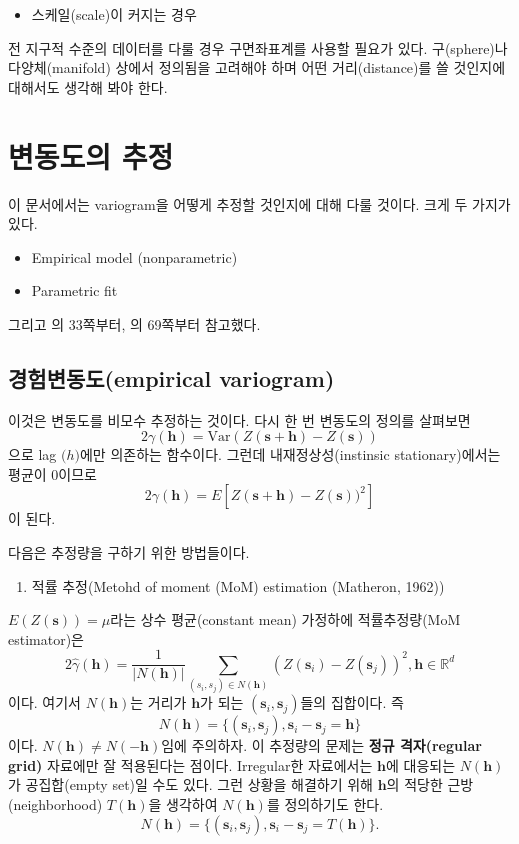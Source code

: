 \documentclass[b5paper,]{scrbook}
\providecommand{\tightlist}{%
  \setlength{\itemsep}{0pt}\setlength{\parskip}{0pt}}
\theoremstyle{plain}
\theoremstyle{definition}
\numberwithin{equation}{section}
\begin{document}
\begin{itemize}
\tightlist
\item
  스케일(scale)이 커지는 경우
\end{itemize}

전 지구적 수준의 데이터를 다룰 경우 구면좌표계를 사용할 필요가 있다. 구(sphere)나 다양체(manifold) 상에서 정의됨을 고려해야 하며 어떤 거리(distance)를 쓸 것인지에 대해서도 생각해 봐야 한다.

\hypertarget{variogramest}{%
\chapter{변동도의 추정}\label{variogramest}}

이 문서에서는 variogram을 어떻게 추정할 것인지에 대해 다룰 것이다. 크게 두 가지가 있다.

\begin{itemize}
\item
  Empirical model (nonparametric)
\item
  Parametric fit
\end{itemize}

그리고 \citep{Gelfand2010}의 33쪽부터, \citep{Cressie1993}의 69쪽부터 참고했다.

\hypertarget{empirical-variogram}{%
\section{경험변동도(empirical variogram)}\label{empirical-variogram}}

이것은 변동도를 비모수 추정하는 것이다. 다시 한 번 변동도의 정의를 살펴보면
\[2\gamma(\mathbf{h})=\text{Var}(Z(\mathbf{s}+\mathbf{h})-Z(\mathbf{s}))\]
으로 lag \(\mathbf(h)\)에만 의존하는 함수이다. 그런데 내재정상성(instinsic stationary)에서는 평균이 0이므로
\[2\gamma(\mathbf{h})=E[Z(\mathbf{s}+\mathbf{h})-Z(\mathbf{s}))^{2}]\]
이 된다.

다음은 추정량을 구하기 위한 방법들이다.

\begin{enumerate}
\def\labelenumi{\arabic{enumi}.}
\tightlist
\item
  적률 추정(Metohd of moment (MoM) estimation (Matheron, 1962))
\end{enumerate}

\(E(Z(\mathbf{s}))=\mu\)라는 상수 평균(constant mean) 가정하에 적률추정량(MoM estimator)은
\[2\hat{\gamma}(\mathbf{h})=\frac{1}{|N(\mathbf{h})|}\sum_{(s_{i},s_{j})\in N(\mathbf{h})}(Z(\mathbf{s}_{i})-Z(\mathbf{s}_{j}))^{2}, \mathbf{h}\in \mathbb{R}^{d}\]
이다. 여기서 \(N(\mathbf{h})\)는 거리가 \(\mathbf{h}\)가 되는 \((\mathbf{s}_{i},\mathbf{s}_{j})\)들의 집합이다. 즉
\[N(\mathbf{h})=\{ (\mathbf{s}_{i},\mathbf{s}_{j}), \mathbf{s}_{i}-\mathbf{s}_{j}=\mathbf{h} \}\]
이다. \(N(\mathbf{h}) \neq N(\mathbf{-h})\)임에 주의하자. 이 추정량의 문제는 \textbf{정규 격자(regular grid)} 자료에만 잘 적용된다는 점이다. Irregular한 자료에서는 \(\mathbf{h}\)에 대응되는 \(N(\mathbf{h})\)가 공집합(empty set)일 수도 있다. 그런 상황을 해결하기 위해 \(\mathbf{h}\)의 적당한 근방(neighborhood) \(T(\mathbf{h})\)을 생각하여 \(N(\mathbf{h})\)를 정의하기도 한다.
\[N(\mathbf{h})=\{ (\mathbf{s}_{i},\mathbf{s}_{j}), \mathbf{s}_{i}-\mathbf{s}_{j}=T(\mathbf{h}) \} .\]
\end{document}
